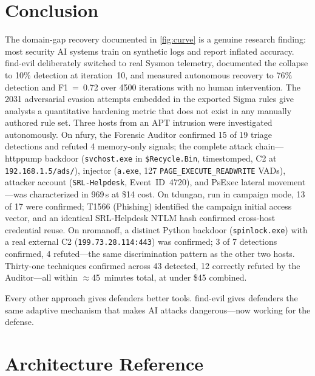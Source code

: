 \documentclass[sigconf, nonacm]{acmart}
\begin{document}
\section{Conclusion}

The domain-gap recovery documented in \cref{fig:curve} is a genuine
research finding: most security AI systems train on synthetic logs and
report inflated accuracy. find-evil deliberately switched to real
Sysmon telemetry, documented the collapse to 10\% detection at
iteration~10, and measured autonomous recovery to 76\% detection and
F1~=~0.72 over \num{4500} iterations with no human intervention. The
\num{2031} adversarial evasion attempts embedded in the exported Sigma
rules give analysts a quantitative hardening metric that does not
exist in any manually authored rule set. Three hosts from an APT intrusion were investigated autonomously. On
nfury, the Forensic Auditor confirmed 15 of 19 triage detections and
refuted 4 memory-only signals; the complete attack chain---httppump
backdoor (\texttt{svchost.exe} in \texttt{\$Recycle.Bin}, timestomped,
C2 at \texttt{192.168.1.5/ads/}), injector (\texttt{a.exe},
127 \texttt{PAGE\_EXECUTE\_READWRITE} VADs), attacker account
(\texttt{SRL-Helpdesk}, Event~ID~4720), and PsExec lateral
movement---was characterized in 969\,s at \$14 cost. On tdungan,
run in campaign mode, 13 of 17 were confirmed; T1566 (Phishing)
identified the campaign initial access vector, and an identical
SRL-Helpdesk NTLM hash confirmed cross-host credential reuse.
On nromanoff, a distinct Python backdoor (\texttt{spinlock.exe})
with a real external C2 (\texttt{199.73.28.114:443}) was confirmed;
3 of 7 detections confirmed, 4 refuted---the same discrimination
pattern as the other two hosts.
Thirty-one techniques confirmed across 43 detected, 12 correctly
refuted by the Auditor---all within $\approx$45~minutes total,
at under \$45 combined.

Every other approach gives defenders better tools. find-evil gives
defenders the same adaptive mechanism that makes AI attacks
dangerous—now working for the defense.

\FloatBarrier
\section*{Architecture Reference}
\end{document}
